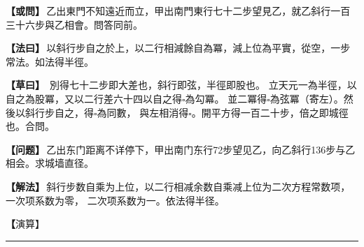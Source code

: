 \documentclass[11pt,a4paper]{article}
\let\origsquare\square
\renewcommand{\square}{\ensuremath{\origsquare}}%
\newcommand{\longline}{\noindent\rule{\textwidth}{0.4pt}}
\newcommand{\clOWEN}[1]{%
  \par\vspace{0.3em}%
  \noindent\textcolor{problemcolor}{\textbf{【或問】}}\,{\tradfont #1}\par\nopagebreak%
}
\newcommand{\mdOWEN}[1]{%
  \par\vspace{0.3em}%
  \noindent\textcolor{problemcolor}{\textbf{【问题】}}\,{\modfont #1}\par\nopagebreak%
}
\newcommand{\clFAYUE}[1]{%
  \par\noindent\textcolor{methodcolor}{\textbf{【法曰】}}\,{\tradfont #1}\par\nopagebreak%
}
\newcommand{\mdFAYUE}[1]{%
  \par\noindent\textcolor{methodcolor}{\textbf{【解法】}}\,{\modfont #1}\par\nopagebreak%
}
\newcommand{\clTSAOYUE}[1]{%
  \par\noindent\textcolor{workcolor}{\textbf{【草曰】}}\,{\tradfont #1}\par%
}
\newcommand{\mdTSAOYUE}[1]{%
  \par\noindent\textcolor{workcolor}{\textbf【演算】}}\,{\modfont #1}\par%
\begin{document}
\begin{paracol}{2}

\begin{leftcolumn}
\clOWEN{乙出東門不知遠近而立，甲出南門東行七十二步望見乙，就乙斜行一百三十六步與乙相會。問答同前。}

\clFAYUE{以斜行步自之於上，以二行相減餘自為冪，減上位為平實，從空，一步常法。如法得半徑。}

\clTSAOYUE{%
別得七十二步即大差也，斜行即弦，半徑即股也。
立天元一為半徑，以自之為股冪，又以二行差六十四以自之得$\square$為勾冪。
並二冪得$\square$為弦冪（寄左）。然後以斜行步自之，得$\square$為同數，
與左相消得$\square$。開平方得一百二十步，倍之即城徑也。合問。}
\end{leftcolumn}

\switchcolumn

\begin{rightcolumn}
\mdOWEN{乙出东门距离不详停下，甲出南门东行72步望见乙，向乙斜行136步与乙相会。求城墙直径。}

\mdFAYUE{斜行步数自乘为上位，以二行相减余数自乘减上位为二次方程常数项，一次项系数为零，
二次项系数为一。依法得半径。}

\mdTSAOYUE{%
辨识得：72步即为大差，斜行即为弦，半径即为股。
设天元一为半径，自乘为股冪，又以二行差64自乘得$\square$为勾冪。
二冪相加得$\square$为弦冪（寄左）。然后以斜行步自乘，得$\square$为同数，
与左式相消得$\square$。开平方得120步，加倍即城径。符合所问。}
\end{rightcolumn}

\end{paracol}

\vspace{0.3cm}
\begin{center}\longline\end{center}
\end{document}
